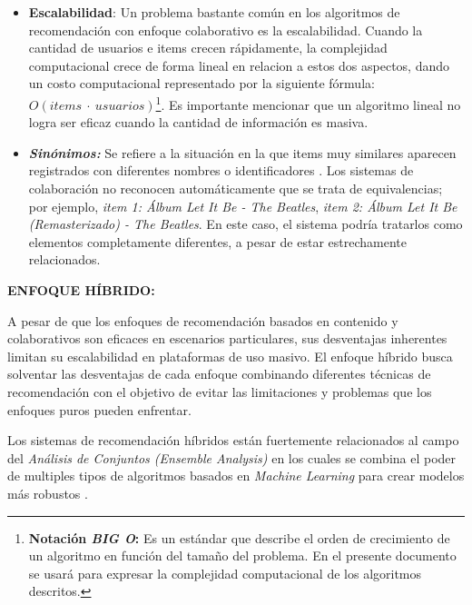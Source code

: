 \newpage
\thispagestyle{plain}
\vspace*{0.2cm}
\begin{itemize}
    \item \textbf{Escalabilidad}: Un problema bastante común en los algoritmos de recomendación con enfoque colaborativo es la escalabilidad. Cuando la cantidad de usuarios e items crecen rápidamente, la complejidad computacional crece de forma lineal en relacion a estos dos aspectos, dando un costo computacional representado por la siguiente fórmula: $O(items \ \cdot \ usuarios)$\footnote{\textbf{Notación \textit{BIG O}:}  Es un estándar que describe el orden de crecimiento de un algoritmo en función del tamaño del problema. En el presente documento se usará para expresar la complejidad computacional de los algoritmos descritos.}. Es importante mencionar que un algoritmo lineal no logra ser eficaz cuando la cantidad de información es masiva.

    \item \textbf{\textit{Sinónimos: }} Se refiere a la situación en la que items muy similares aparecen registrados con diferentes nombres o identificadores \parencite{ISINKAYE2015261}. Los sistemas de colaboración no reconocen automáticamente que se trata de equivalencias; por ejemplo, \textit{item 1: Álbum Let It Be - The Beatles}, \textit{item 2: Álbum Let It Be (Remasterizado) - The Beatles}. En este caso, el sistema podría tratarlos como elementos completamente diferentes, a pesar de estar estrechamente relacionados.
\end{itemize}

\newpage
\thispagestyle{plain}
\vspace*{0.2cm}

\textbf{ENFOQUE HÍBRIDO: }

A pesar de que los enfoques de recomendación basados en contenido y colaborativos son eficaces en escenarios particulares, sus desventajas inherentes limitan su escalabilidad en plataformas de uso masivo.  El enfoque híbrido busca solventar las desventajas de cada enfoque combinando diferentes técnicas de recomendación con el objetivo de evitar las limitaciones y problemas que los enfoques puros pueden enfrentar.

Los sistemas de recomendación híbridos están fuertemente relacionados al campo del \textit{Análisis de Conjuntos (Ensemble Analysis)} en los cuales se combina el poder de multiples tipos de algoritmos basados en \textit{Machine Learning} para crear modelos más robustos \parencite{Aggarwal2016}.  

